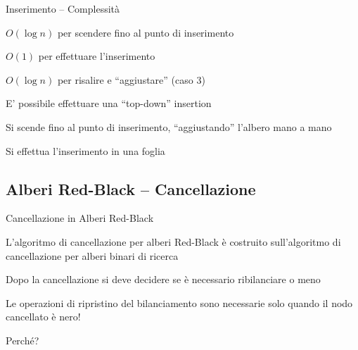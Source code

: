 \begin{frame}{Inserimento -- Complessità}

\vspace{-9pt}
\begin{myboxtitle}
\BIL
\item $O(\log n)$ per scendere fino al punto di inserimento
\item $O(1)$ per effettuare l'inserimento
\item $O(\log n)$ per risalire e “aggiustare” (caso 3)
\EIL
\end{myboxtitle}

\begin{myboxtitle}[Nota]
\BIL
\item E' possibile effettuare una “top-down” insertion
\item Si scende fino al punto di inserimento, “aggiustando” l'albero mano a mano
\item Si effettua l'inserimento in una foglia
\EIL
\end{myboxtitle}

\end{frame}

\subsection{Alberi Red-Black -- Cancellazione}

\begin{frame}{Cancellazione in Alberi Red-Black}

\BIL
\item L’algoritmo di cancellazione per alberi Red-Black è costruito 
sull’algoritmo di cancellazione per alberi binari di ricerca
\item Dopo la cancellazione si deve decidere se è necessario ribilanciare o meno
\item Le operazioni di ripristino del bilanciamento sono necessarie solo quando il nodo cancellato è nero! 
\item Perché?
\EIL

\end{frame}

